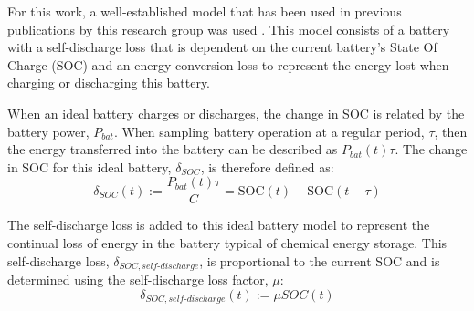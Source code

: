 For this work, a well-established model that has been used in previous publications by this research group was used \cite{Rowe2013, Rowe2014, Rowe2014a}. This model consists of a battery with a self-discharge loss that is dependent on the current battery's State Of Charge (SOC) and an energy conversion loss to represent the energy lost when charging or discharging this battery. 


When an ideal battery charges or discharges, the change in SOC is related by the battery power, $P_{bat}$. When sampling battery operation at a regular period, $\tau$, then the energy transferred into the battery can be described as $P_{bat}(t)\tau$. The change in SOC for this ideal battery, $\delta_{SOC}$, is therefore defined as:\vspace{6pt}
\begin{equation}
\delta_{SOC}(t) := \frac{P_{bat}(t)\tau}{C} = \text{SOC}(t) - \text{SOC}(t-\tau)
\end{equation}

The self-discharge loss is added to this ideal battery model to represent the continual loss of energy in the battery typical of chemical energy storage. This self-discharge loss, $\delta_{SOC,self\text{-}discharge}$, is proportional to the current SOC and is determined using the self-discharge loss factor, $\mu$:
\begin{equation}
	\delta_{SOC,self\text{-}discharge}(t) := \mu SOC(t)
\end{equation}

